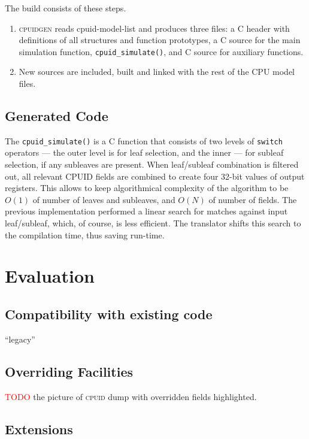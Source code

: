 \documentclass[a4paper,10pt,oneside,unicode]{article}
\newcommand{\cpuid}{\textsc{cpuid} }
\newcommand{\cpuidgen}{\textsc{cpuidgen} }
\newcommand{\todo}[1][]{\textcolor{red}{TODO #1}}
\begin{document}
The build consists of these steps.
\begin{enumerate}
    \item \cpuidgen reads cpuid-model-list and produces three files: a C header with definitions of all structures and function prototypes, a C source for the main simulation function, \texttt{cpuid\_simulate()}, and C source for auxiliary functions.
    \item New sources are included, built and linked with the rest of the CPU model files.
\end{enumerate}

\subsection{Generated Code}

The \texttt{cpuid\_simulate()} is a C function that consists of two levels of \texttt{switch} operators --- the outer level is for leaf selection, and the inner --- for subleaf selection, if any subleaves are present. When leaf/subleaf combination is filtered out, all relevant CPUID fields are combined to create four 32-bit values of output registers. This allows to keep algorithmical complexity of the algorithm to be $O(1)$ of number of leaves and subleaves, and $O(N)$ of number of fields. The previous implementation performed a linear search for matches against input leaf/subleaf, which, of course, is less efficient. The translator shifts this search to the compilation time, thus saving run-time.

\section{Evaluation}\label{sec:evaluation}

\subsection{Compatibility with existing code}

“legacy” 

\subsection{Overriding Facilities}

\todo the picture of \cpuid dump with overridden fields highlighted.


\subsection{Extensions}
\end{document}
